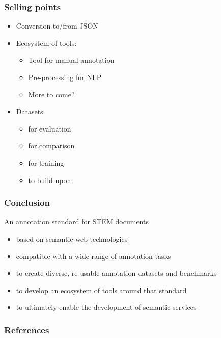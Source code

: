 \documentclass[aspectratio=169]{beamer}
\begin{document}
\begin{frame}
    \frametitle{Selling points}
    \begin{itemize}
        \item Conversion to/from JSON
        \item Ecosystem of tools:
            \begin{itemize}
                \item Tool for manual annotation
                \item Pre-processing for NLP
                \item More to come?
            \end{itemize}
        \item Datasets
            \begin{itemize}
                \item for evaluation
                \item for comparison
                \item for training
                \item to build upon
            \end{itemize}
    \end{itemize}
\end{frame}


\begin{frame}
    \frametitle{Conclusion}
    An annotation standard for STEM documents
    \begin{itemize}
        \item based on semantic web technologies
        \item compatible with a wide range of annotation tasks
        \item to create diverse, re-usable annotation datasets and benchmarks
        \item to develop an ecosystem of tools around that standard
        \item to ultimately enable the development of semantic services
    \end{itemize}
\end{frame}


\begin{frame}[allowframebreaks,t]
    \frametitle{References}
    \printbibliography
\end{frame}
\end{document}
